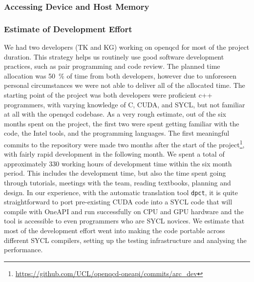 \documentclass[../main]{subfiles}
\begin{document}
\subsubsection{Accessing Device and Host Memory}\label{sec:openqcd_memoryaccess}


\subsubsection{Estimate of Development Effort}\label{sec:openqcd_personhours}

We had two developers (TK and KG) working on openqcd for most of the project duration.
This strategy helps us routinely use good software development practices, such as pair programming and code review.
The planned time allocation was 50~\% of time from both developers, however due to unforeseen personal circumstances we were not able to deliver all of the allocated time.
The starting point of the project was both developers were proficient c++ programmers, with varying knowledge of C, CUDA, and SYCL, but not familiar at all with the openqcd codebase.
As a very rough estimate, out of the six months spent on the project, the first two were spent getting familiar with the code, the Intel tools, and the programming languages.
The first meaningful commits to the repository were made two months after the start of the project\footnote{\url{https://github.com/UCL/openqcd-oneapi/commits/arc_dev}}, with fairly rapid development in the following month.
We spent a total of approximately 330 working hours of development time within the six month period.
This includes the development time, but also the time spent going through tutorials, meetings with the team, reading textbooks, planning and design.
In our experience, with the automatic translation tool \texttt{dpct}, it is quite straightforward to port pre-existing CUDA code into a SYCL code that will compile with OneAPI and run successfully on CPU and GPU hardware and the tool is accessible to even programmers who are SYCL novices.
We estimate that most of the development effort went into making the code portable across different SYCL compilers, setting up the testing infrastructure and analysing the performance.
\end{document}
